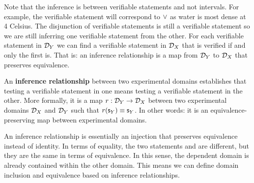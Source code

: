 \documentclass[11pt,letterpaper,fleqn]{memoir} %
\begin{document}
Note that the inference is between verifiable statements and not intervals. For example, the verifiable statement  will correspond to $\vee$ as water is most dense at 4 Celsius. The disjunction of verifiable statements is still a verifiable statement so we are still inferring one verifiable statement from the other. For each verifiable statement in $\mathcal{D}_Y$ we can find a verifiable statement in $\mathcal{D}_X$ that is verified if and only the first is. That is: an inference relationship is a map from $\mathcal{D}_Y$ to $\mathcal{D}_X$ that preserves equivalence.

\begin{mathSection}
	\begin{defn}
		An \textbf{inference relationship} between two experimental domains establishes that testing a verifiable statement in one means testing a verifiable statement in the other. More formally, it is a map $r: \mathcal{D}_Y \to \mathcal{D}_X$ between two experimental domains $\mathcal{D}_X$ and $\mathcal{D}_Y$ such that $r(\mathsf{s}_Y) \equiv \mathsf{s}_Y$. In other words: it is an equivalence-preserving map between experimental domains.
	\end{defn}
\end{mathSection}

An inference relationship is essentially an injection that preserves equivalence instead of identity. In terms of equality, the two statements  and  are different, but they are the same in terms of equivalence. In this sense, the dependent domain is already contained within the other domain. This means we can define domain inclusion and equivalence based on inference relationships.
\end{document}

